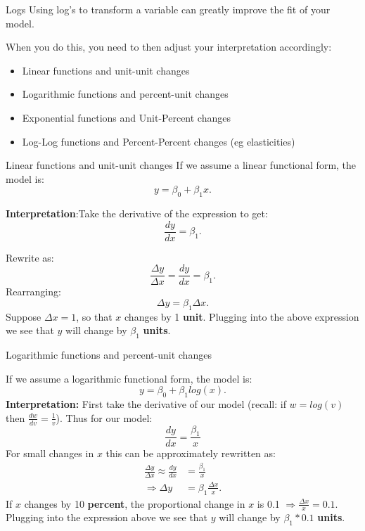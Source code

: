 \documentclass[
  ignorenonframetext,
]{beamer}
\begin{document}
\begin{frame}{Logs}
\protect\hypertarget{logs-1}{}
Using log's to transform a variable can greatly improve the fit of your
model.

When you do this, you need to then adjust your interpretation
accordingly:

\begin{itemize}
\item
  Linear functions and unit-unit changes
\item
  Logarithmic functions and percent-unit changes
\item
  Exponential functions and Unit-Percent changes
\item
  Log-Log functions and Percent-Percent changes (eg elasticities)
\end{itemize}
\end{frame}

\begin{frame}{Linear functions and unit-unit changes}
\protect\hypertarget{linear-functions-and-unit-unit-changes}{}
If we assume a linear functional form, the model is: \[
y=\beta_0+\beta_1x.
\]

\textbf{Interpretation}:Take the derivative of the expression to get: \[
\frac{dy}{dx}=\beta_1.
\]

Rewrite as: \[
\frac{\Delta y}{\Delta x}=\frac{dy}{dx}=\beta_1.
\] Rearranging: \[
\Delta y= \beta_1 \Delta x.
\] Suppose \(\Delta x=1\), so that \(x\) changes by 1 \textbf{unit}.
Plugging into the above expression we see that \(y\) will change by
\(\beta_1\) \textbf{units}.
\end{frame}

\begin{frame}{Logarithmic functions and percent-unit changes}
\protect\hypertarget{logarithmic-functions-and-percent-unit-changes}{}
\bigskip

If we assume a logarithmic functional form, the model is: \[
y=\beta_0+\beta_1 log(x).
\] \textbf{Interpretation:} First take the derivative of our model
(recall: if \(w=log(v)\) then \(\frac{dw}{dv}=\frac{1}{v}\)). Thus for
our model: \[
\frac{dy}{dx}=\frac{\beta_1}{x}
\] For small changes in \(x\) this can be approximately rewritten as: \[
\begin{aligned}
\frac{\Delta y}{\Delta x}\approx \frac{dy}{dx}&=\frac{\beta_1}{x}\\
\Rightarrow \Delta y&= \beta_1 \frac{ \Delta x}{x}.
\end{aligned}
\] If \(x\) changes by 10 \textbf{percent}, the proportional change in
\(x\) is 0.1 \(\Rightarrow \frac{\Delta x}{x}=0.1\). Plugging into the
expression above we see that \(y\) will change by \(\beta_1*0.1\)
\textbf{units}.
\end{frame}
\end{document}

